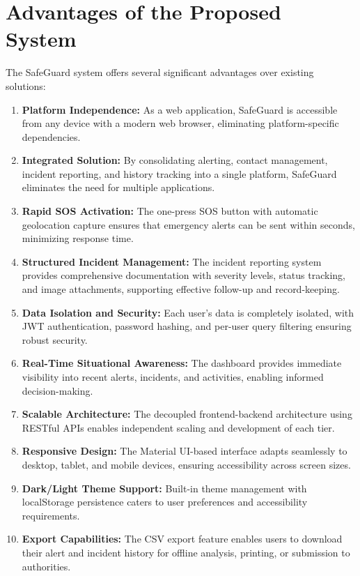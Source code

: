 \section{Advantages of the Proposed System}

The SafeGuard system offers several significant advantages over existing solutions:

\begin{enumerate}[label=\arabic*.]
  \item \textbf{Platform Independence:} As a web application, SafeGuard is accessible from any device with a modern web browser, eliminating platform-specific dependencies.

  \item \textbf{Integrated Solution:} By consolidating alerting, contact management, incident reporting, and history tracking into a single platform, SafeGuard eliminates the need for multiple applications.

  \item \textbf{Rapid SOS Activation:} The one-press SOS button with automatic geolocation capture ensures that emergency alerts can be sent within seconds, minimizing response time.

  \item \textbf{Structured Incident Management:} The incident reporting system provides comprehensive documentation with severity levels, status tracking, and image attachments, supporting effective follow-up and record-keeping.

  \item \textbf{Data Isolation and Security:} Each user's data is completely isolated, with JWT authentication, password hashing, and per-user query filtering ensuring robust security.

  \item \textbf{Real-Time Situational Awareness:} The dashboard provides immediate visibility into recent alerts, incidents, and activities, enabling informed decision-making.

  \item \textbf{Scalable Architecture:} The decoupled frontend-backend architecture using RESTful APIs enables independent scaling and development of each tier.

  \item \textbf{Responsive Design:} The Material UI-based interface adapts seamlessly to desktop, tablet, and mobile devices, ensuring accessibility across screen sizes.

  \item \textbf{Dark/Light Theme Support:} Built-in theme management with localStorage persistence caters to user preferences and accessibility requirements.

  \item \textbf{Export Capabilities:} The CSV export feature enables users to download their alert and incident history for offline analysis, printing, or submission to authorities.
\end{enumerate}
